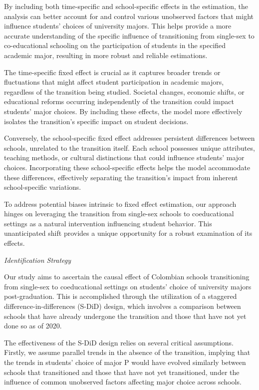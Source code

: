 By including both time-specific and school-specific effects in the estimation, the analysis can better account for and control various unobserved factors that might influence students' choices of university majors. This helps provide a more accurate understanding of the specific influence of transitioning from single-sex to co-educational schooling on the participation of students in the specified academic major, resulting in more robust and reliable estimations.

The time-specific fixed effect is crucial as it captures broader trends or fluctuations that might affect student participation in academic majors, regardless of the transition being studied. Societal changes, economic shifts, or educational reforms occurring independently of the transition could impact students' major choices. By including these effects, the model more effectively isolates the transition's specific impact on student decisions.

Conversely, the school-specific fixed effect addresses persistent differences between schools, unrelated to the transition itself. Each school possesses unique attributes, teaching methods, or cultural distinctions that could influence students' major choices. Incorporating these school-specific effects helps the model accommodate these differences, effectively separating the transition's impact from inherent school-specific variations.

To address potential biases intrinsic to fixed effect estimation, our approach hinges on leveraging the transition from single-sex schools to coeducational settings as a natural intervention influencing student behavior. This unanticipated shift provides a unique opportunity for a robust examination of its effects.

\vspace{5mm}
\textit{Identification Strategy}
\vspace{3mm}

Our study aims to ascertain the causal effect of Colombian schools transitioning from single-sex to coeducational settings on students' choice of university majors post-graduation. This is accomplished through the utilization of a staggered difference-in-differences (S-DiD) design, which involves a comparison between schools that have already undergone the transition and those that have not yet done so as of 2020.

The effectiveness of the S-DiD design relies on several critical assumptions. Firstly, we assume parallel trends in the absence of the transition, implying that the trends in students' choice of major P would have evolved similarly between schools that transitioned and those that have not yet transitioned, under the influence of common unobserved factors affecting major choice across schools.

